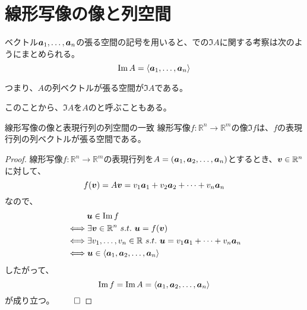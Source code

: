 \documentclass[../../../topic_linear-algebra]{subfiles}
\begin{document}
\sectionline
\section{線形写像の像と列空間}\label{sec:image-and-column-space}

ベクトル$\vb*{a}_1, \ldots, \vb*{a}_n$の張る空間の記号を用いると、での$\Im A$に関する考察は次のようにまとめられる。
\begin{equation*}
  \Im A = \langle \vb*{a}_1, \ldots, \vb*{a}_n \rangle
\end{equation*}

つまり、$A$の列ベクトルが張る空間が$\Im A$である。

このことから、$\Im A$を$A$のと呼ぶこともある。

\begin{theorem*}{線形写像の像と表現行列の列空間の一致}
  線形写像$f\colon \mathbb{R}^n \to \mathbb{R}^m$の像$\Im f$は、$f$の表現行列の列ベクトルが張る空間である。
\end{theorem*}

\begin{proof}
  線形写像$f\colon \mathbb{R}^n \to \mathbb{R}^m$の表現行列を$A = (\vb*{a}_1, \vb*{a}_2, \dots, \vb*{a}_n)$とするとき、$\vb*{v} \in \mathbb{R}^n$に対して、
  \begin{equation*}
    f(\vb*{v}) = A \vb*{v} = v_1 \vb*{a}_1 + v_2 \vb*{a}_2 + \cdots + v_n \vb*{a}_n
  \end{equation*}
  なので、
  \begin{align*}
     & \phantom{\longleftrightarrow\,\,\,} \vb*{u} \in \Im f                                                                 \\
     & \Longleftrightarrow \exists \vb*{v} \in \mathbb{R}^n \,\, s.t. \,\, \vb*{u} = f(\vb*{v})                                   \\
     & \Longleftrightarrow \exists v_1, \dots, v_n \in \mathbb{R} \,\, s.t. \,\, \vb*{u} = v_1 \vb*{a}_1 + \cdots + v_n \vb*{a}_n \\
     & \Longleftrightarrow \vb*{u} \in \langle \vb*{a}_1, \vb*{a}_2, \dots, \vb*{a}_n \rangle
  \end{align*}
  したがって、
  \begin{equation*}
    \Im f = \Im A = \langle \vb*{a}_1, \vb*{a}_2, \dots, \vb*{a}_n \rangle
  \end{equation*}
  が成り立つ。 $\qed$
\end{proof}
\end{document}
